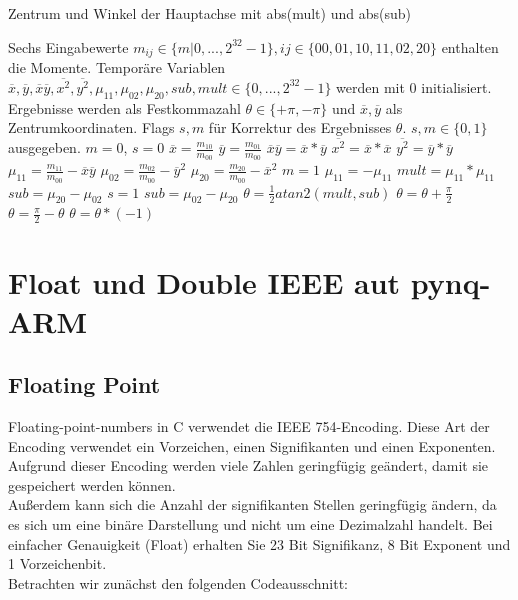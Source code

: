 \documentclass[a4paper]{report}
\begin{document}
\begin{algorithm}
\caption{Zentrum und Winkel der Hauptachse mit abs(mult) und abs(sub)}
\label{Momente}
\begin{algorithmic}[1]
\Require Sechs Eingabewerte {$m_{ij}\in\{m|0,...,2^{32}-1\},ij\in\{00,01,10,11,02,20\}$} enthalten die Momente. Temporäre Variablen $\overline{x},\overline{y},\overline{x}\overline{y},\overline{x^2},\overline{y^2},\mu_{11},\mu_{02},\mu_{20},sub,mult\in \{0,...,2^{32}-1\}$ werden mit 0 initialisiert. Ergebnisse werden als Festkommazahl $\theta \in \{+\pi, -\pi\}$ und  $\overline{x},\overline{y}$ als Zentrumkoordinaten. Flags $s,m$ für Korrektur des Ergebnisses $\theta$. {$s,m\in\{0,1\}$} ausgegeben.
\State $m = 0$, $s = 0$
	\State $\overline{x} = \frac{m_{10}}{m_{00}}$
	\State $\overline{y} = \frac{m_{01}}{m_{00}}$
	\State $\overline{x}\overline{y} = \overline{x} * \overline{y}$
	\State $\overline{x^2} = \overline{x} * \overline{x}$
	\State $\overline{y^2} = \overline{y} * \overline{y}$
	\State $\mu_{11} = \frac{m_{11}}{m_{00}} - \overline{x}\overline{y} $
	\State $\mu_{02} = \frac{m_{02}}{m_{00}} - \overline{y}^2 $
	\State $\mu_{20} = \frac{m_{20}}{m_{00}} - \overline{x}^2 $	
		\State $m = 1$
		\State $\mu_{11} = -\mu_{11}$
	\EndIf
	\State $mult = \mu_{11}* \mu_{11}$
		\State $sub = \mu_{20}-\mu_{02}$
		\State $s = 1$
	\Else
		\State $sub = \mu_{02}-\mu_{20}$
    \EndIf  
	\State $\theta = \frac{1}{2} atan2(mult, sub)$
\EndIf
{}
	\State $\theta = \theta + \frac{\pi}{2}$
	\State $\theta = \frac{\pi}{2} - \theta$
	\State $\theta= \theta*(-1)$
\EndIf  


\end{algorithmic}
\end{algorithm}

\newpage
\section{Float und Double IEEE aut pynq-ARM}

\subsection{Floating Point}
Floating-point-numbers in C verwendet die IEEE 754-Encoding.
Diese Art der Encoding verwendet ein Vorzeichen, einen Signifikanten und einen Exponenten.
Aufgrund dieser Encoding werden viele Zahlen geringfügig geändert, damit sie gespeichert werden können.\\
Außerdem kann sich die Anzahl der signifikanten Stellen geringfügig ändern, da es sich um eine binäre Darstellung und nicht um eine Dezimalzahl handelt. Bei einfacher Genauigkeit (Float) erhalten Sie 23 Bit Signifikanz, 8 Bit Exponent und 1 Vorzeichenbit.\\
Betrachten wir zunächst den folgenden Codeausschnitt:\\
\end{document}
